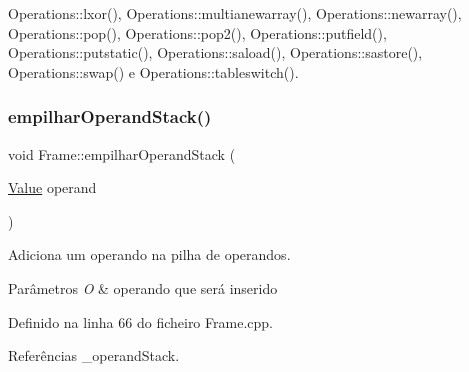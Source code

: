Operations\+::lxor(), Operations\+::multianewarray(), Operations\+::newarray(), Operations\+::pop(), Operations\+::pop2(), Operations\+::putfield(), Operations\+::putstatic(), Operations\+::saload(), Operations\+::sastore(), Operations\+::swap() e Operations\+::tableswitch().

\mbox{\label{classFrame_af2481010c4795fbe1cba48122609cf1e}} 
\subsubsection{\texorpdfstring{empilhar\+Operand\+Stack()}{empilharOperandStack()}}
{\footnotesize\ttfamily void Frame\+::empilhar\+Operand\+Stack (\begin{DoxyParamCaption}\item[{\hyperlink{structValue}{Value}}]{operand }\end{DoxyParamCaption})}



Adiciona um operando na pilha de operandos. 


\begin{DoxyParams}{Parâmetros}
{\em O} & operando que será inserido \\
\hline
\end{DoxyParams}


Definido na linha 66 do ficheiro Frame.\+cpp.



Referências \+\_\+operand\+Stack.



